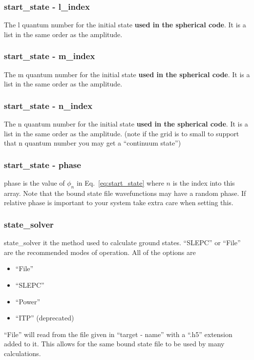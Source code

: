 \documentclass{article}
\begin{document}
\subsubsection{start\_state - l\_index}
The l quantum number for the initial state \textbf{used in the spherical code}. It is a list in the same order as the amplitude.

\subsubsection{start\_state - m\_index}
The m quantum number for the initial state \textbf{used in the spherical code}. It is a list in the same order as the amplitude.

\subsubsection{start\_state - n\_index}
The n quantum number for the initial state \textbf{used in the spherical code}. It is a list in the same order as the amplitude. (note if the grid is to small to support that n quantum number you may get a ``continuum state'')

\subsubsection{start\_state - phase}
phase is the value of $\phi_n$ in Eq.~\ref{eq:start_state} where $n$ is the index into this array. Note that the bound state file wavefunctions may have a random phase. If relative phase is important to your system take extra care when setting this.

\subsubsection{state\_solver}
\label{ssub:state_solver}
state\_solver it the method used to calculate ground states. ``SLEPC'' or ``File'' are the recommended modes of operation. All of the options are
\begin{itemize}
  \item ``File''
  \item ``SLEPC''
  \item ``Power''
  \item ``ITP'' (deprecated)
\end{itemize}

``File'' will read from the file given in ``target - name'' with a ``.h5'' extension added to it. This allows for the same bound state file to be used by many calculations.
\end{document}
